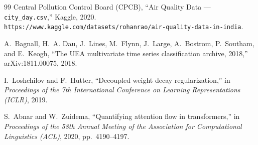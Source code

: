 \begin{thebibliography}{99}
Central Pollution Control Board (CPCB),
``Air Quality Data --- \texttt{city\_day.csv},''
Kaggle, 2020.
\texttt{https://www.kaggle.com/datasets/rohanrao/air-quality-data-in-india}.

A.~Bagnall, H.~A. Dau, J.~Lines, M.~Flynn, J.~Large, A.~Bostrom, P.~Southam, and E.~Keogh,
``The UEA multivariate time series classification archive, 2018,''
arXiv:1811.00075, 2018.

I.~Loshchilov and F.~Hutter,
``Decoupled weight decay regularization,''
in \textit{Proceedings of the 7th International Conference on Learning Representations (ICLR)}, 2019.

S.~Abnar and W.~Zuidema,
``Quantifying attention flow in transformers,''
in \textit{Proceedings of the 58th Annual Meeting of the Association for Computational Linguistics (ACL)},
2020, pp.~4190--4197.

\end{thebibliography}
